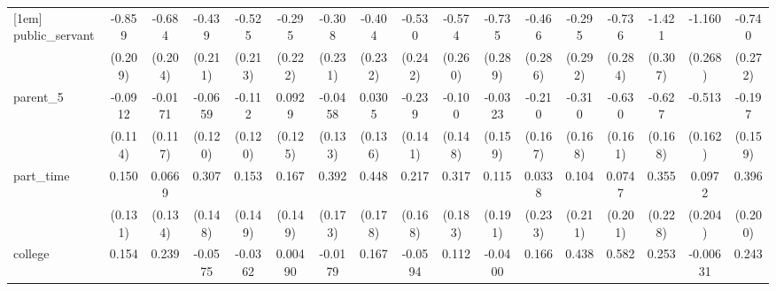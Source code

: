 {\begin{tabular}{l*{16}{c}}
[1em]
public\_servant      &      -0.859\sym{***}&      -0.684\sym{***}&      -0.439\sym{*}  &      -0.525\sym{*}  &      -0.295         &      -0.308         &      -0.404         &      -0.530\sym{*}  &      -0.574\sym{*}  &      -0.735\sym{*}  &      -0.466         &      -0.295         &      -0.736\sym{**} &      -1.421\sym{***}&      -1.160\sym{***}&      -0.740\sym{**} \\
                    &     (0.209)         &     (0.204)         &     (0.211)         &     (0.213)         &     (0.222)         &     (0.231)         &     (0.232)         &     (0.242)         &     (0.260)         &     (0.289)         &     (0.286)         &     (0.292)         &     (0.284)         &     (0.307)         &     (0.268)         &     (0.272)         \\
[1em]
parent\_5            &     -0.0912         &     -0.0171         &     -0.0659         &      -0.112         &      0.0929         &     -0.0458         &      0.0305         &      -0.239         &      -0.100         &     -0.0323         &      -0.210         &      -0.310         &      -0.630\sym{***}&      -0.627\sym{***}&      -0.513\sym{**} &      -0.197         \\
                    &     (0.114)         &     (0.117)         &     (0.120)         &     (0.120)         &     (0.125)         &     (0.133)         &     (0.136)         &     (0.141)         &     (0.148)         &     (0.159)         &     (0.167)         &     (0.168)         &     (0.161)         &     (0.168)         &     (0.162)         &     (0.159)         \\
[1em]
part\_time           &       0.150         &      0.0669         &       0.307\sym{*}  &       0.153         &       0.167         &       0.392\sym{*}  &       0.448\sym{*}  &       0.217         &       0.317         &       0.115         &      0.0338         &       0.104         &      0.0747         &       0.355         &      0.0972         &       0.396\sym{*}  \\
                    &     (0.131)         &     (0.134)         &     (0.148)         &     (0.149)         &     (0.149)         &     (0.173)         &     (0.178)         &     (0.168)         &     (0.183)         &     (0.191)         &     (0.233)         &     (0.211)         &     (0.201)         &     (0.228)         &     (0.204)         &     (0.200)         \\
[1em]
college             &       0.154         &       0.239         &     -0.0575         &     -0.0362         &     0.00490         &     -0.0179         &       0.167         &     -0.0594         &       0.112         &     -0.0400         &       0.166         &       0.438\sym{*}  &       0.582\sym{**} &       0.253         &    -0.00631         &       0.243         \\

\end{tabular}}
